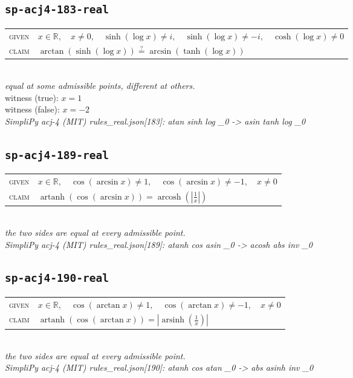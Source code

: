 \documentclass[11pt]{article}
\begin{document}
\subsection*{\texttt{sp-acj4-183-real}}
\begin{tabular}{@{}l@{\quad}l@{}}
\textsc{given} & $x \in \mathbb{R},\quad x \neq 0,\quad \sinh\left(\log x\right) \neq i,\quad \sinh\left(\log x\right) \neq -i,\quad \cosh\left(\log x\right) \neq 0$ \\[4pt]
\textsc{claim} & $\displaystyle \arctan\left(\sinh\left(\log x\right)\right) \overset{?}{=} \arcsin\left(\tanh\left(\log x\right)\right)$ \\
\end{tabular}\\[2pt]
{\small\emph{equal at some admissible points, different at others.}}\\
{\footnotesize\color{gray}witness (true): $x = 1$}\\
{\footnotesize\color{gray}witness (false): $x = -2$}\\
\emph{SimpliPy acj-4 (MIT) rules\_real.json[183]: atan sinh log \_0  ->  asin tanh log \_0}\\

\subsection*{\texttt{sp-acj4-189-real}}
\begin{tabular}{@{}l@{\quad}l@{}}
\textsc{given} & $x \in \mathbb{R},\quad \cos\left(\arcsin x\right) \neq 1,\quad \cos\left(\arcsin x\right) \neq -1,\quad x \neq 0$ \\[4pt]
\textsc{claim} & $\displaystyle \operatorname{artanh}\left(\cos\left(\arcsin x\right)\right) = \operatorname{arcosh}\left(\left|\frac{1}{x}\right|\right)$ \\
\end{tabular}\\[2pt]
{\small\emph{the two sides are equal at every admissible point.}}\\
\emph{SimpliPy acj-4 (MIT) rules\_real.json[189]: atanh cos asin \_0  ->  acosh abs inv \_0}\\

\subsection*{\texttt{sp-acj4-190-real}}
\begin{tabular}{@{}l@{\quad}l@{}}
\textsc{given} & $x \in \mathbb{R},\quad \cos\left(\arctan x\right) \neq 1,\quad \cos\left(\arctan x\right) \neq -1,\quad x \neq 0$ \\[4pt]
\textsc{claim} & $\displaystyle \operatorname{artanh}\left(\cos\left(\arctan x\right)\right) = \left|\operatorname{arsinh}\left(\frac{1}{x}\right)\right|$ \\
\end{tabular}\\[2pt]
{\small\emph{the two sides are equal at every admissible point.}}\\
\emph{SimpliPy acj-4 (MIT) rules\_real.json[190]: atanh cos atan \_0  ->  abs asinh inv \_0}\\
\end{document}
